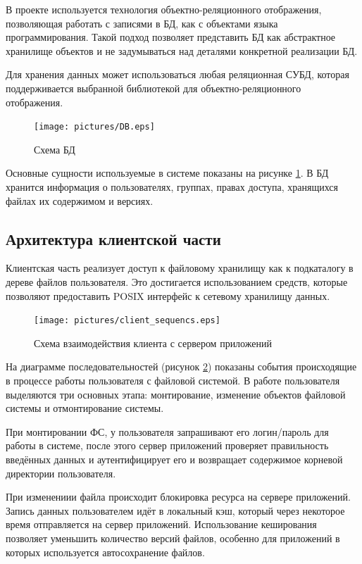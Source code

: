 \documentclass[utf8,usehyperref,12pt]{G7-32}
\begin{document}
В проекте используется технология объектно-реляционного отображения, позволяющая работать с записями в БД, как с объектами языка программирования. Такой подход позволяет представить БД как абстрактное хранилище объектов и не задумываться над деталями конкретной реализации БД.

Для хранения данных может использоваться любая реляционная СУБД, которая поддерживается выбранной библиотекой для объектно-реляционного отображения.

\begin{figure}[ht]
   \centering%
   \texttt{[image: pictures/DB.eps]}
   \caption{Схема БД}\label{fig:db_scheme}
 \end{figure}

Основные сущности используемые в системе показаны на рисунке \ref{fig:db_scheme}. В БД хранится информация о пользователях, группах, правах доступа, хранящихся файлах их содержимом и версиях.
 
\subsection{Архитектура клиентской части}

Клиентская часть реализует доступ к файловому хранилищу как к подкаталогу в дереве файлов пользователя. Это достигается использованием средств, которые позволяют предоставить POSIX интерфейс к сетевому хранилищу данных.

\begin{figure}[ht]
   \centering%
   \texttt{[image: pictures/client\_sequencs.eps]}
   \caption{Схема взаимодействия клиента с сервером приложений}\label{fig:client_sequence}
 \end{figure}

На диаграмме последовательностей (рисунок \ref{fig:client_sequence}) показаны события происходящие в процессе работы пользователя с файловой системой. В работе пользователя выделяются три основных этапа: монтирование, изменение объектов файловой системы и отмонтирование системы. 

При монтировании ФС, у пользователя запрашивают его логин/пароль для работы в системе, после этого сервер приложений проверяет правильность введённых данных и аутентифицирует его и возвращает содержимое корневой директории пользователя.

При изменениии файла происходит блокировка ресурса на сервере приложений. Запись данных пользователем идёт в локальный кэш, который через некоторое время отправляется на сервер приложений. Использование кеширования позволяет уменьшить количество версий файлов, особенно для приложений в которых используется автосохранение файлов.
\end{document}
